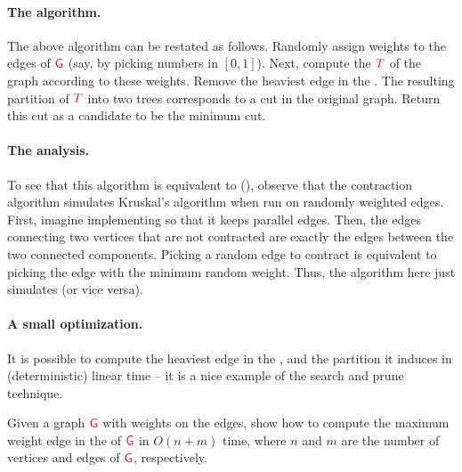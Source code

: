 \paragraph*{The algorithm.}
The above algorithm can be restated as follows. Randomly assign
weights to the edges of ${\textcolor{red}{\mathsf{G}}}$ (say, by picking numbers in
$[0,1]$). Next, compute the \MST{} ${\textcolor{red}{T}}$ of the graph according to
these weights. Remove the heaviest edge in the \MST{}. The resulting
partition of ${\textcolor{red}{T}}$ into two trees corresponds to a cut in the
original graph. Return this cut as a candidate to be the minimum cut. 

\paragraph*{The analysis.}
To see that this algorithm is equivalent to \MinCut{}
(), observe that the contraction algorithm
simulates Kruskal's \MST{} algorithm when run on randomly weighted
edges. First, imagine implementing \MinCut{} so that it keeps parallel
edges. Then, the edges connecting two vertices that are not
contracted are exactly the edges between the two connected
components. Picking a random edge to contract is equivalent to
picking the edge with the minimum random weight. Thus, the \MST{}
algorithm here just simulates \MinCut{} (or vice versa). 

\paragraph*{A small optimization.}
It is possible to compute the heaviest edge in the \MST{}, and the
partition it induces in (deterministic) linear time -- it is a 
nice example of the search and prune technique.  
\begin{exercise}
    Given a graph ${\textcolor{red}{\mathsf{G}}}$ with weights on the edges, show how to compute
    the maximum weight edge in the \MST{} of ${\textcolor{red}{\mathsf{G}}}$ in $O(n + m)$ time,
    where $n$ and $m$ are the number of vertices and edges of ${\textcolor{red}{\mathsf{G}}}$,
    respectively.%
\end{exercise}

